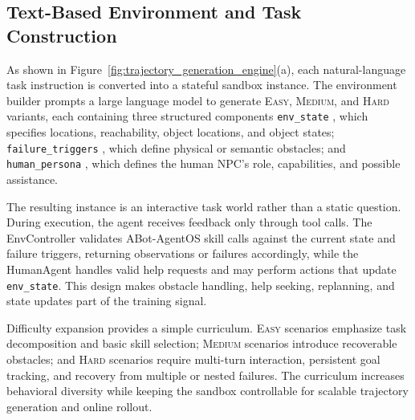 \subsection{Text-Based Environment and Task Construction}
\label{sec:text-env}

As shown in Figure~\ref{fig:trajectory_generation_engine}(a), each natural-language
task instruction is converted into a stateful sandbox instance. The
environment builder prompts a large language model to generate \textsc{Easy}, \textsc{Medium}, and \textsc{Hard} variants, each containing three structured components \texttt{env\_state} ,
which specifies locations, reachability, object locations, and object
states; \texttt{failure\_triggers} , which define physical or semantic obstacles; and \texttt{human\_persona} , which defines the human NPC's role, capabilities,
and possible assistance.

The resulting instance is an interactive task world rather than a static
question. During execution, the agent receives feedback only through
tool calls. The EnvController validates ABot-AgentOS skill calls against
the current state and failure triggers, returning observations or
failures accordingly, while the HumanAgent handles valid help requests
and may perform actions that update \texttt{env\_state}. This design makes
obstacle handling, help seeking, replanning, and state updates part of
the training signal.



Difficulty expansion provides a simple curriculum. \textsc{Easy}
scenarios emphasize task decomposition and basic skill selection;
\textsc{Medium} scenarios introduce recoverable obstacles; and
\textsc{Hard} scenarios require multi-turn interaction, persistent
goal tracking, and recovery from multiple or nested failures. The
curriculum increases behavioral diversity while keeping the sandbox
controllable for scalable trajectory generation and online rollout.

